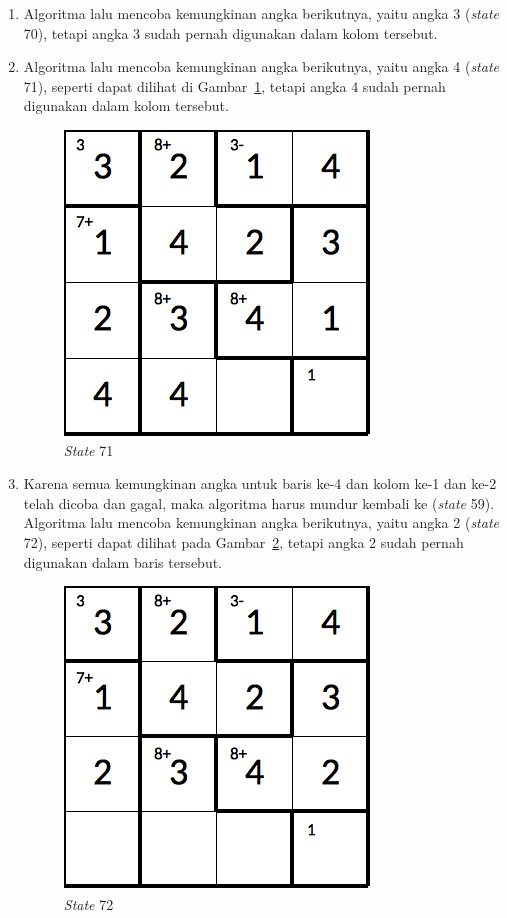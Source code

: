 \begin{enumerate}
\item Algoritma lalu mencoba kemungkinan angka berikutnya, yaitu angka 3 (\textit{state} 70), tetapi angka 3 sudah pernah digunakan dalam kolom tersebut.
\item Algoritma lalu mencoba kemungkinan angka berikutnya, yaitu angka 4 (\textit{state} 71), seperti dapat dilihat di Gambar~\ref{fig:lampiranbt20}, tetapi angka 4 sudah pernah digunakan dalam kolom tersebut.

\begin{figure}
\centering
\captionsetup{justification=centering}
\includegraphics[scale=0.333]{Gambar/backtracking/State71}
\caption[\textit{State} 71]{\textit{State} 71}
\label{fig:lampiranbt20}
\end{figure}

\item Karena semua kemungkinan angka untuk baris ke-4 dan kolom ke-1 dan ke-2 telah dicoba dan gagal, maka algoritma harus mundur kembali ke (\textit{state} 59). Algoritma lalu mencoba kemungkinan angka berikutnya, yaitu angka 2 (\textit{state} 72), seperti dapat dilihat pada Gambar~\ref{fig:lampiranbt21}, tetapi angka 2 sudah pernah digunakan dalam baris tersebut.

\begin{figure}
\centering
\captionsetup{justification=centering}
\includegraphics[scale=0.333]{Gambar/backtracking/State72}
\caption[\textit{State} 72]{\textit{State} 72}
\label{fig:lampiranbt21}
\end{figure}


\end{enumerate}
